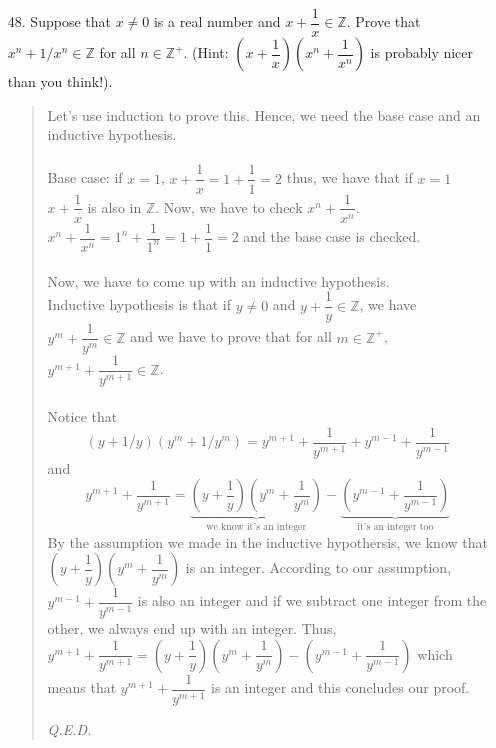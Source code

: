 \documentclass[12pt, a4paper]{article}                      %
\newcommand{\intz}{\mathbb{Z}}
\newcommand{\intzp}{\mathbb{Z^+}}
\begin{document}
\begin{itemize}
\item[48.]
Suppose that $x \neq 0$ is a real number and $x + \dfrac{1}{x} \in \intz$.
Prove that $x^n + 1/x^n \in \intz$ for all $n \in \intzp$. (Hint: $(x + \dfrac{1}{x})(x^n + \dfrac{1}{x^n})$ is probably nicer than you think!).
\begin{quote}
Let's use induction to prove this. Hence, we need the base case and an inductive hypothesis.\\\\
Base case: if $x = 1$, $x + \dfrac{1}{x} = 1 + \dfrac{1}{1} = 2$ thus, we have that if $x = 1$
$x + \dfrac{1}{x}$ is also in $\intz$. Now, we have to check $x^n + \dfrac{1}{x^n}$.
$x^n + \dfrac{1}{x^n} = 1^n + \dfrac{1}{1^n} = 1 + \dfrac{1}{1} = 2$ and the base case is checked.\\\\
Now, we have to come up with an inductive hypothesis.\\
Inductive hypothesis is that if $y \neq 0$ and $y + \dfrac{1}{y} \in \intz$, we have $y^m + \dfrac{1}{y^m} \in \intz$ and we have to prove that for all $m \in \intzp$,
$y^{m + 1} + \dfrac{1}{y^{m + 1}} \in \intz$.\\\\
Notice that
$$(y + 1/y)(y^m + 1/y^m) =  y^{m + 1} + \dfrac{1}{y^{m + 1}} + y^{m - 1} + \dfrac{1}{y^{m - 1}}$$
and
$$y^{m + 1} + \dfrac{1}{y^{m + 1}} = \underbrace{(y + \dfrac{1}{y})(y^m + \dfrac{1}{y^m})}_{\mbox{we know it's an integer}} - \underbrace{(y^{m - 1} + \dfrac{1}{y^{m - 1}})}_{\mbox{it's an integer too}}$$
By the assumption we made in the inductive hypothersis, we know that $(y + \dfrac{1}{y})(y^m + \dfrac{1}{y^m})$ is an integer.
According to our assumption, $y^{m - 1} + \dfrac{1}{y^{m - 1}}$ is also an integer and if we subtract one integer from the other, we always end up with an integer.
Thus, $y^{m + 1} + \dfrac{1}{y^{m + 1}} = (y + \dfrac{1}{y})(y^m + \dfrac{1}{y^m}) - (y^{m - 1} + \dfrac{1}{y^{m - 1}})$ which means that $y^{m + 1} + \dfrac{1}{y^{m + 1}}$
is an integer and this concludes our proof.
\begin{flushright}
\textit{Q.E.D.}
\end{flushright}
\end{quote}


\end{itemize}
\end{document}
